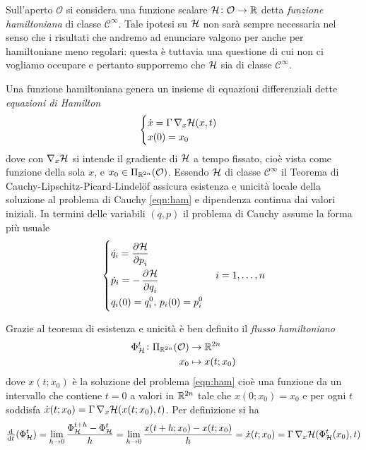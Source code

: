 Sull'aperto $ \mathcal{O} $ si considera una funzione scalare $ \mathcal{H} \colon \mathcal{O} \to \mathbb{R} $ detta \emph{funzione hamiltoniana} di classe $ \mathcal{C}^{\infty} $. Tale ipotesi su $ \mathcal{H} $ non sarà sempre necessaria nel senso che i risultati che andremo ad enunciare valgono per anche per hamiltoniane meno regolari: questa è tuttavia una questione di cui non ci vogliamo occupare e pertanto supporremo che $ \mathcal{H} $ sia di classe $ \mathcal{C}^\infty $.

Una funzione hamiltoniana genera un insieme di equazioni differenziali dette \emph{equazioni di Hamilton}
\begin{equation} \label{eqn:ham}
    \begin{cases}
    \dot{x} = \Gamma \, \nabla_x \mathcal{H}(x, t) \\
    x(0) = x_0
    \end{cases}
\end{equation}
dove con $ \nabla_x \mathcal{H} $ si intende il gradiente di $ \mathcal{H} $ a tempo fissato, cioè vista come funzione della sola $ x $, e $ x_0 \in \Pi_{\mathbb{R}^{2n}}(\mathcal{O}) $. Essendo $ \mathcal{H} $ di classe $ \mathcal{C}^\infty $ il Teorema di Cauchy-Lipschitz-Picard-Lindelöf assicura esistenza e unicità locale della soluzione al problema di Cauchy \eqref{eqn:ham} e dipendenza continua dai valori iniziali. In termini delle variabili $ (q, p) $ il problema di Cauchy assume la forma più usuale
\begin{equation}
    \begin{dcases}
        \dot{q}_i = \dpd{\ham}{p_i} \\
        \dot{p}_i = -\dpd{\ham}{q_i} \\
        q_i(0) = q_{i}^0, \, p_i(0) = p_i^0 \\
    \end{dcases}
    \quad i = 1, \ldots, n
\end{equation}

Grazie al teorema di esistenza e unicità è ben definito il \emph{flusso hamiltoniano}
\begin{align}
    \Phi_{\mathcal{H}}^t \colon \Pi_{\mathbb{R}^{2n}}(\mathcal{O}) & \to \mathbb{R}^{2n} \\
    x_0 & \mapsto x(t; x_0)
\end{align}
dove $ x(t; x_0) $ è la soluzione del problema \eqref{eqn:ham} cioè una funzione da un intervallo che contiene $ t=0 $ a valori in $ \mathbb{R}^{2n} $ tale che $ x(0; x_0) = x_0 $ e per ogni $ t $ soddisfa $ \dot{x}(t; x_0) = \Gamma \, \nabla_x \mathcal{H}(x(t; x_0), t) $. Per definizione si ha
\[
    \od{}{t} (\Phi^t_\ham) = \lim_{h \to 0} \frac{\Phi^{t+h}_\ham - \Phi^{t}_\ham}{h} = \lim_{h \to 0} \frac{x(t+h; x_0) - x(t; x_0)}{h} = \dot{x}(t; x_0) = \Gamma \, \nabla_x \ham(\Phi_\ham^t(x_0), t)
\]

